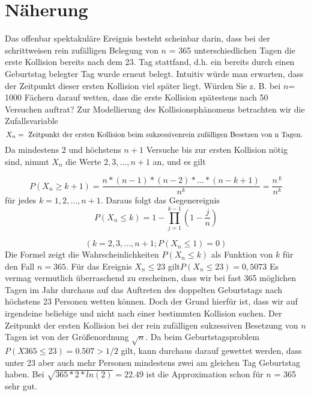 \documentclass[11pt]{article}
\begin{document}
    \section{Näherung}
    \newline
    Das offenbar spektakuläre Ereignis besteht scheinbar darin, dass bei der schrittweisen rein zufälligen Belegung
    von \(n\) = 365 unterschiedlichen Tagen die erste Kollision bereits nach dem 23. Tag stattfand, d.h. ein bereits
    durch einen Geburtstag belegter Tag wurde erneut belegt. Intuitiv würde man erwarten, dass der Zeitpunkt dieser
    ersten Kollision viel später liegt. Würden Sie z. B. bei \(n\)= 1000 Fächern darauf wetten, dass die erste Kollision
    spätestens nach 50 Versuchen auftrat?
    \newline
    Zur Modellierung des Kollisionsphänomens betrachten wir die Zufallsvariable
    \newline
    \[{ X_{n} = \text{ Zeitpunkt der ersten Kollision beim sukzessiven \newline rein zufälligen Besetzen von n Tagen. } }\]
    \newline
    Da mindestens \(2\) und höchstens \(n + 1\) Versuche bis zur ersten Kollision nötig sind, nimmt \(X_n\) die Werte \(2,3, . . ., n + 1\) an, und es gilt

    \newline\newline
    \[P(X_{n} \geq k+1) = \frac {n*(n-1)*(n-2)* ... * (n-k + 1)}{n^k} = \frac{n^{\underline{\ k}}}{n^k}\]
    \newline\newline
    für jedes \(k = 1,2,...,n+1\).
    \newline
    Daraus folgt das Gegenereignis
    \newline\newline
    \[P(X_{n} \leq k) = 1-\prod \limits_{j=1}^{k-1}(1- \frac{j}{n})\]

    \newline

    \[(k=2,3,...,n+1; P(X_n\leq1) = 0)\]
    \newline
    Die Formel zeigt die Wahrscheinlichkeiten \(P(X_{n} \leq k)\) als Funktion von \(k\) für den Fall \(n = 365\).
    Für das Ereignis \({X_{n} \leq 23}\) gilt\( P(X_{n} \leq 23) = 0,5073 \)
    \newline
    \newline
    Es vermag vermutlich überraschend zu erscheinen, dass wir bei fast 365 möglichen Tagen im Jahr durchaus auf das
    Auftreten des doppelten Geburtstags nach höchstens 23 Personen wetten können. Doch der Grund hierfür ist, dass wir
    auf irgendeine beliebige und nicht nach einer bestimmten Kollision suchen.
    Der Zeitpunkt der ersten Kollision bei der rein zufälligen sukzessiven Besetzung von \(n\) Tagen ist von
    der Größenordnung \(\sqrt{n}\).
    \newline
    \newline
    Da beim Geburtstagsproblem  \(P (X365 \leq 23) = 0.507 > 1/2\) gilt, kann durchaus darauf gewettet werden,
    dass unter 23 aber auch mehr Personen mindestens zwei am gleichen Tag Geburtstag haben. Bei
    \(\sqrt{365 * 2 * ln(2)} = 22.49\)
    ist die Approximation schon für \(n\) = 365 sehr gut.
\end{document}
